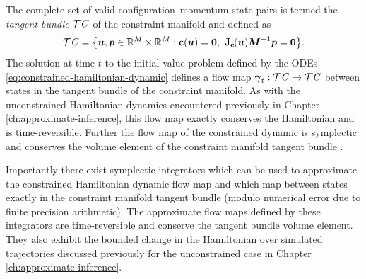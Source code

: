 The complete set of valid configuration--momentum state pairs is termed the \emph{tangent bundle} $\mathcal{T}\mathit{C}$ of the constraint manifold and defined as
\begin{equation}\label{eq:constraint-tanget-bundle}
  \sset{T}\set{C} = \lbr 
    \vct{u},\vct{p} \in \reals^M \times \reals^M :
    \vctfunc{c}(\vct{u}) = \vct{0},~
    \jacob{\vctfunc{c}}{\vct{u}}\mtx{M}^{-1}\vct{p} = \vct{0} 
  \rbr.
\end{equation}
The solution at time $t$ to the initial value problem defined by the \acp{ODE} \eqref{eq:constrained-hamiltonian-dynamic} defines a flow map $\boldsymbol{\gamma}_t : \mathcal{T}\mathit{C} \to \mathcal{T}\mathit{C}$ between states in the tangent bundle of the constraint manifold. As with the unconstrained Hamiltonian dynamics encountered previously in Chapter \ref{ch:approximate-inference}, this flow map exactly conserves the Hamiltonian and is time-reversible. Further the flow map of the constrained dynamic is symplectic and  conserves the volume element of the constraint manifold tangent bundle \citep{leimkuhler2004simulating}.

Importantly there exist symplectic integrators which can be used to approximate the constrained Hamiltonian dynamic flow map and which map between states exactly in the constraint manifold tangent bundle (modulo numerical error due to finite precision arithmetic). The approximate flow maps defined by these integrators are time-reversible and conserve the tangent bundle volume element. They also exhibit the bounded change in the Hamiltonian over simulated trajectories discussed previously for the unconstrained case in Chapter \ref{ch:approximate-inference}.

